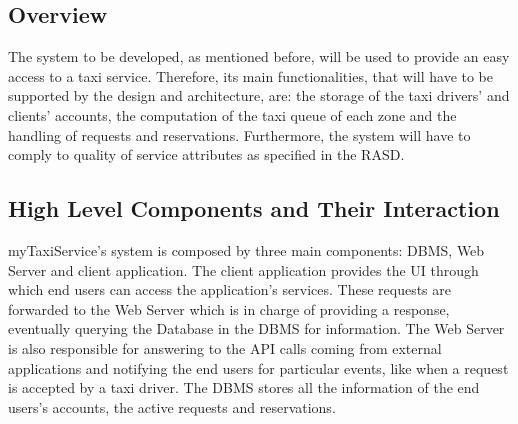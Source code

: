 \documentclass{article}
\begin{document}
\subsection{Overview}
The system to be developed, as mentioned before, will be used to provide an easy access to a taxi service. Therefore, its main functionalities, that will have to be supported by the design and architecture, are: the storage of the taxi drivers' and clients' accounts, the computation of the taxi queue of each zone and the handling of requests and reservations. Furthermore, the system will have to comply to quality of service attributes as specified in the RASD\@.
\subsection{High Level Components and Their Interaction}
myTaxiService's system is composed by three main components: DBMS, Web Server and client application. The client application provides the UI through which end users can access the application's services. These requests are forwarded to the Web Server which is in charge of providing a response, eventually querying the Database in the DBMS for information. The Web Server is also responsible for answering to the API calls coming from external applications and notifying the end users for particular events, like when a request is accepted by a taxi driver. The DBMS stores all the information of the end users's accounts, the active requests and reservations.
\end{document}
